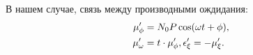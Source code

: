 В нашем случае, связь между производными ождидания:
\begin{align*}
\mu'_\phi	&= N_0P\cos(\omega t + \phi), \\
\mu'_\omega &= t\cdot\mu'_\phi, \epsilon'_\xi = -\mu'_\xi.
\end{align*}


